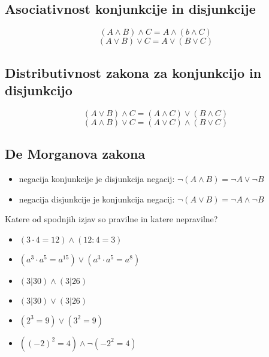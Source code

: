             
             \subsection{Asociativnost konjunkcije in disjunkcije}
                $$(A\land B)\land C = A\land(b\land C) $$
                $$ (A\lor B)\lor C = A\lor (B\lor C) $$
             

             \subsection{Distributivnost zakona za konjunkcijo in disjunkcijo}
                $$(A\lor B)\land C = (A\land C)\lor(B\land C) $$
                $$ (A\land B)\lor C = (A\lor C)\land(B\lor C) $$
             

             \subsection{De Morganova zakona}
                \begin{itemize}
                    \item negacija konjunkcije je disjunkcija negacij: 
                        $\lnot(A\land B)=\lnot A\lor\lnot B$
                    \item negacija disjunkcije je konjunkcija negacij: 
                        $\lnot(A\lor B)=\lnot A\land\lnot B$
                \end{itemize}                
             
        
         

         
             \begin{naloga}
                Katere od spodnjih izjav so pravilne in katere nepravilne?
                \begin{itemize}
                    \item $(3\cdot 4 = 12)\land(12:4=3)$
                    \item $(a^3\cdot a^5=a^{15})\lor (a^3\cdot a^5=a^8)$
                    \item $(3|30)\land(3|26)$
                    \item $(3|30)\lor(3|26)$
                    \item $(2^3=9)\lor(3^2=9)$
                    \item $((-2)^2=4)\land\lnot(-2^2=4)$
                \end{itemize}
            \end{naloga}
         

